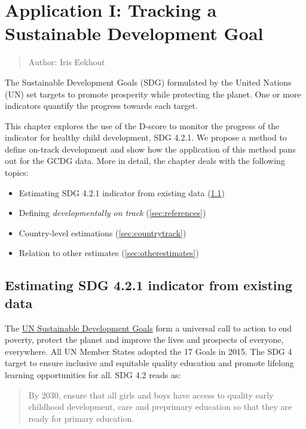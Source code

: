 \documentclass[
]{book}
\providecommand{\tightlist}{%
  \setlength{\itemsep}{0pt}\setlength{\parskip}{0pt}}
\begin{document}
\hypertarget{ch:SDGindicator}{%
\chapter{Application I: Tracking a Sustainable Development Goal}\label{ch:SDGindicator}}

\begin{quote}
Author: Iris Eekhout
\end{quote}

The Sustainable Development Goals (SDG) formulated by the United Nations (UN) set targets to promote prosperity while protecting the planet. One or more indicators quantify the progress towards each target.

This chapter explores the use of the D-score to monitor the progress of the indicator for healthy child development, SDG 4.2.1. We propose a method to define on-track development and show how the application of this method pans out for the GCDG data. More in detail, the chapter deals with the following topics:

\begin{itemize}
\tightlist
\item
  Estimating SDG 4.2.1 indicator from existing data (\ref{sec:application1})
\item
  Defining \emph{developmentally on track} (\ref{sec:references})
\item
  Country-level estimations (\ref{sec:countrytrack})
\item
  Relation to other estimates (\ref{sec:otherestimates})
\end{itemize}

\hypertarget{sec:application1}{%
\section{Estimating SDG 4.2.1 indicator from existing data}\label{sec:application1}}

The \href{https://www.un.org/sustainabledevelopment/development-agenda/}{UN Sustainable Development Goals} form a universal call to action to end poverty, protect the planet and improve the lives and prospects of everyone, everywhere. All UN Member States adopted the 17 Goals in 2015. The SDG 4 target to ensure inclusive and equitable quality education and promote lifelong learning opportunities for all. SDG 4.2 reads as:

\begin{quote}
By 2030, ensure that all girls and boys have access to quality early childhood development, care and preprimary education so that they are ready for primary education.
\end{quote}
\end{document}
